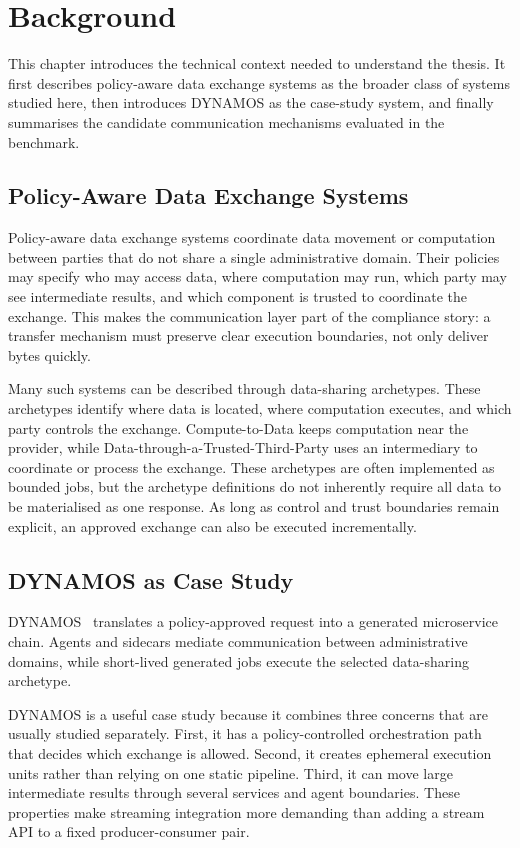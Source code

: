 \chapter{Background}\label{ch:background}

This chapter introduces the technical context needed to understand the thesis. It first describes policy-aware data exchange systems as the broader class of systems studied here, then introduces DYNAMOS as the case-study system, and finally summarises the candidate communication mechanisms evaluated in the benchmark.

\section{Policy-Aware Data Exchange Systems}

Policy-aware data exchange systems coordinate data movement or computation between parties that do not share a single administrative domain. Their policies may specify who may access data, where computation may run, which party may see intermediate results, and which component is trusted to coordinate the exchange. This makes the communication layer part of the compliance story: a transfer mechanism must preserve clear execution boundaries, not only deliver bytes quickly.

Many such systems can be described through data-sharing archetypes. These archetypes identify where data is located, where computation executes, and which party controls the exchange. Compute-to-Data keeps computation near the provider, while Data-through-a-Trusted-Third-Party uses an intermediary to coordinate or process the exchange. These archetypes are often implemented as bounded jobs, but the archetype definitions do not inherently require all data to be materialised as one response. As long as control and trust boundaries remain explicit, an approved exchange can also be executed incrementally.

\section{DYNAMOS as Case Study}

DYNAMOS~\cite{stutterheim2023thesis,stutterheim2023icsa} translates a policy-approved request into a generated microservice chain. Agents and sidecars mediate communication between administrative domains, while short-lived generated jobs execute the selected data-sharing archetype.

DYNAMOS is a useful case study because it combines three concerns that are usually studied separately. First, it has a policy-controlled orchestration path that decides which exchange is allowed. Second, it creates ephemeral execution units rather than relying on one static pipeline. Third, it can move large intermediate results through several services and agent boundaries. These properties make streaming integration more demanding than adding a stream API to a fixed producer-consumer pair.

